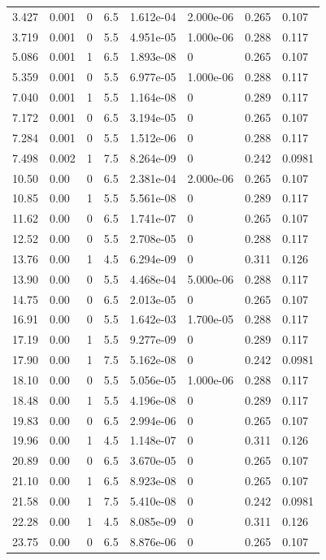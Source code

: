\documentclass[preview]{standalone}
\begin{document}
{{\begin{tabular}{L{1.2cm}C{1.2cm} C{0.3cm}C{0.5cm} C{1.4cm}C{1.4cm} C{1.4cm}C{1.4cm}}
  3.427  &  0.001  & 0     & 6.5 &  1.612e-04  & 2.000e-06  & 0.265 &  0.107   \\ 
  3.719  &  0.001  & 0     & 5.5 &  4.951e-05  & 1.000e-06  & 0.288 &  0.117   \\ 
  5.086  &  0.001  & 1     & 6.5 &  1.893e-08  & 0  & 0.265 &  0.107   \\ 
  5.359  &  0.001  & 0     & 5.5 &  6.977e-05  & 1.000e-06  & 0.288 &  0.117   \\ 
  7.040  &  0.001  & 1     & 5.5 &  1.164e-08  & 0  & 0.289 &  0.117   \\ 
  7.172  &  0.001  & 0     & 6.5 &  3.194e-05  & 0  & 0.265 &  0.107   \\ 
  7.284  &  0.001  & 0     & 5.5 &  1.512e-06  & 0  & 0.288 &  0.117   \\ 
  7.498  &  0.002  & 1     & 7.5 &  8.264e-09  & 0  & 0.242 &  0.0981   \\ 
  10.50  &  0.00  & 0     & 6.5 &  2.381e-04  & 2.000e-06  & 0.265 &  0.107   \\ 
  10.85  &  0.00  & 1     & 5.5 &  5.561e-08  & 0  & 0.289 &  0.117   \\ 
  11.62  &  0.00  & 0     & 6.5 &  1.741e-07  & 0  & 0.265 &  0.107   \\ 
  12.52  &  0.00  & 0     & 5.5 &  2.708e-05  & 0  & 0.288 &  0.117   \\ 
  13.76  &  0.00  & 1     & 4.5 &  6.294e-09  & 0  & 0.311 &  0.126   \\ 
  13.90  &  0.00  & 0     & 5.5 &  4.468e-04  & 5.000e-06  & 0.288 &  0.117   \\ 
  14.75  &  0.00  & 0     & 6.5 &  2.013e-05  & 0  & 0.265 &  0.107   \\ 
  16.91  &  0.00  & 0     & 5.5 &  1.642e-03  & 1.700e-05  & 0.288 &  0.117   \\ 
  17.19  &  0.00  & 1     & 5.5 &  9.277e-09  & 0  & 0.289 &  0.117   \\ 
  17.90  &  0.00  & 1     & 7.5 &  5.162e-08  & 0  & 0.242 &  0.0981   \\ 
  18.10  &  0.00  & 0     & 5.5 &  5.056e-05  & 1.000e-06  & 0.288 &  0.117   \\ 
  18.48  &  0.00  & 1     & 5.5 &  4.196e-08  & 0  & 0.289 &  0.117   \\ 
  19.83  &  0.00  & 0     & 6.5 &  2.994e-06  & 0  & 0.265 &  0.107   \\ 
  19.96  &  0.00  & 1     & 4.5 &  1.148e-07  & 0  & 0.311 &  0.126   \\ 
  20.89  &  0.00  & 0     & 6.5 &  3.670e-05  & 0  & 0.265 &  0.107   \\ 
  21.10  &  0.00  & 1     & 6.5 &  8.923e-08  & 0  & 0.265 &  0.107   \\ 
  21.58  &  0.00  & 1     & 7.5 &  5.410e-08  & 0  & 0.242 &  0.0981   \\ 
  22.28  &  0.00  & 1     & 4.5 &  8.085e-09  & 0  & 0.311 &  0.126   \\ 
  23.75  &  0.00  & 0     & 6.5 &  8.876e-06  & 0  & 0.265 &  0.107   \\ 
\hline 
\end{tabular} 

}}
\end{document}
